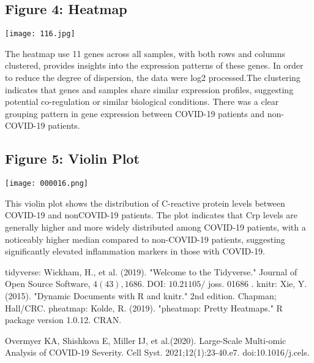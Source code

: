 \documentclass[10pt]{article}
\begin{document}
\subsection*{Figure 4: Heatmap}

\begin{center}
\texttt{[image: 116.jpg]}
\end{center}

\noindent The heatmap use 11 genes across all samples, with both rows and columns clustered, provides insights into the expression patterns of these genes. In order to reduce the degree of dispersion, the data were log2 processed.The clustering indicates that genes and samples share similar expression profiles, suggesting potential co-regulation or similar biological conditions. There was a clear grouping pattern in gene expression between COVID-19 patients and non-COVID-19 patients.

\subsection*{Figure 5: Violin Plot}


\begin{center}
\texttt{[image: 000016.png]}
\end{center}

\noindent This violin plot shows the distribution of C-reactive protein levels between COVID-19 and nonCOVID-19 patients. The plot indicates that Crp levels are generally higher and more widely distributed among COVID-19 patients, with a noticeably higher median compared to non-COVID-19 patients, suggesting significantly elevated inflammation markers in those with COVID-19.


\begin{thebibliography}{9}
	 tidyverse: Wickham, H., et al. (2019). "Welcome to the Tidyverse." Journal of Open Source Software, $4(43), 1686$. DOI: $10.21105 /$ joss. 01686 .
	 knitr: Xie, Y. (2015). "Dynamic Documents with R and knitr." 2nd edition. Chapman; Hall/CRC.
         pheatmap: Kolde, R. (2019). "pheatmap: Pretty Heatmaps." R package version 1.0.12. CRAN.

         Overmyer KA, Shishkova E, Miller IJ, et al.(2020). Large-Scale Multi-omic Analysis of COVID-19 Severity. Cell Syst. 2021;12(1):23-40.e7. doi:10.1016/j.cels.
\end{thebibliography}
\end{document}
